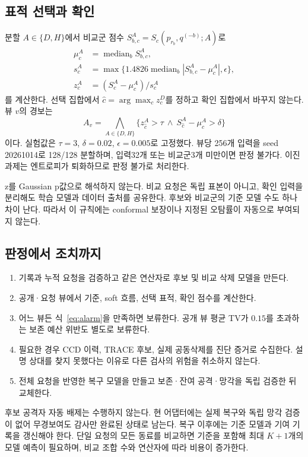 \documentclass[10pt,a4paper]{article}
\newcommand{\med}{\operatorname{median}}
\begin{document}
\subsection{표적 선택과 확인}
분할 $A\in\{D,H\}$에서 비교군 점수 $S_{b,c}^A=S_c(p_{r_b},q^{(-b)};A)$로
\begin{align}
 \mu_c^A&=\med_b S_{b,c}^A,\\
 s_c^A&=\max\{1.4826\med_b|S_{b,c}^A-\mu_c^A|,\epsilon\},\\
 z_c^A&=(S_c^A-\mu_c^A)/s_c^A
\end{align}
를 계산한다. 선택 집합에서 $\widehat c=\arg\max_c z_c^D$를 정하고 확인 집합에서 바꾸지 않는다.
뷰 $v$의 경보는
\begin{equation}\label{eq:alarm}
 A_v=\bigwedge_{A\in\{D,H\}}
 \{z_{\widehat c}^A>\tau\ \land\ S_{\widehat c}^A-\mu_{\widehat c}^A>\delta\}
\end{equation}
이다. 실험값은 $\tau=3$, $\delta=0.02$, $\epsilon=0.005$로 고정했다.
뷰당 256개 입력을 seed 20261014로 128/128 분할하며, 입력32개 또는 비교군3개 미만이면 판정 불가다.
이진 과제는 엔트로피가 퇴화하므로 판정 불가로 처리한다.

z를 Gaussian p값으로 해석하지 않는다. 비교 요청은 독립 표본이 아니고,
확인 입력을 분리해도 학습 모델과 데이터 출처를 공유한다.
후보와 비교군의 기준 모델 수도 하나 차이 난다.
따라서 이 규칙에는 conformal 보장이나 지정된 오탐률이 자동으로 부여되지 않는다.

\subsection{판정에서 조치까지}
\begin{enumerate}
\item 기록과 누적 요청을 검증하고 같은 연산자로 후보 및 비교 삭제 모델을 만든다.
\item 공개·요청 뷰에서 기준, soft 흐름, 선택 표적, 확인 점수를 계산한다.
\item 어느 뷰든 식~\eqref{eq:alarm}을 만족하면 보류한다. 공개 뷰 평균 TV가
      $0.15$를 초과하는 보존 예산 위반도 별도로 보류한다.
\item 필요한 경우 CCD 이력, TRACE 후보, 실제 공동삭제를 진단 증거로 수집한다.
      설명 상대를 찾지 못했다는 이유로 다른 검사의 위험을 취소하지 않는다.
\item 전체 요청을 반영한 복구 모델을 만들고 보존·잔여 공격·망각을 독립 검증한 뒤 교체한다.
\end{enumerate}
후보 공격자 자동 배제는 수행하지 않는다. 현 어댑터에는 실제 복구와 독립 망각 검증이 없어
무경보여도 감사만 완료된 상태로 남는다. 복구 이후에는 기준 모델과 기여 기록을 갱신해야 한다.
단일 요청의 모든 동료를 비교하면 기준을 포함해 최대 $K+1$개의 모델 예측이 필요하며,
비교 조합 수와 연산자에 따라 비용이 증가한다.
\end{document}
